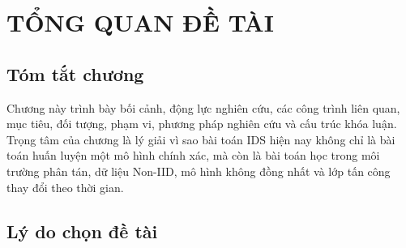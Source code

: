 \chapter{TỔNG QUAN ĐỀ TÀI}\label{Chapter1}

\section*{Tóm tắt chương}

Chương này trình bày bối cảnh, động lực nghiên cứu, các công trình liên quan, mục tiêu, đối tượng, phạm vi, phương pháp nghiên cứu và cấu trúc khóa luận. Trọng tâm của chương là lý giải vì sao bài toán IDS hiện nay không chỉ là bài toán huấn luyện một mô hình chính xác, mà còn là bài toán học trong môi trường phân tán, dữ liệu Non-IID, mô hình không đồng nhất và lớp tấn công thay đổi theo thời gian.

\section{Lý do chọn đề tài}

